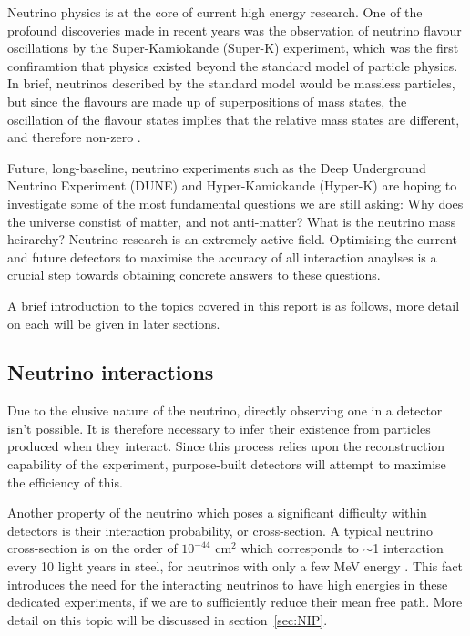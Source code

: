 Neutrino physics is at the core of current high energy research. One of the profound discoveries made in recent years was the observation of neutrino flavour oscillations by the Super-Kamiokande (Super-K) experiment, which was the first confiramtion that physics existed beyond the standard model of particle physics. In brief, neutrinos described by the standard model would be massless particles, but since the flavours are made up of superpositions of mass states, the oscillation of
the flavour states implies that the relative mass states are different, and therefore non-zero \cite{nuInt}.

    Future, long-baseline,  neutrino experiments such as the Deep Underground Neutrino Experiment (DUNE) and Hyper-Kamiokande (Hyper-K) are hoping to investigate some of the most fundamental questions we are still asking: Why does the universe constist of matter, and not anti-matter? What is the neutrino mass heirarchy? Neutrino research is an extremely active field. Optimising the current and future detectors to maximise the accuracy of all interaction anaylses is a crucial step towards obtaining concrete answers to these questions. 

    A brief introduction to the topics covered in this report is as follows, more detail on each will be given in later sections. 

\subsection{Neutrino interactions}

Due to the elusive nature of the neutrino, directly observing one in a detector isn't possible. It is therefore necessary to infer their existence from particles produced when they interact. Since this process relies upon the reconstruction capability of the experiment, purpose-built detectors will attempt to maximise the efficiency of this.

Another property of the neutrino which poses a significant difficulty within detectors is their interaction probability, or cross-section. A typical neutrino cross-section is on the order of $ 10^{-44} $ cm$^{2}$ which corresponds to $\sim$1 interaction every 10 light years in steel, for neutrinos with only a few MeV energy \cite{nuOsc}. This fact introduces the need for the interacting neutrinos to have high energies in these dedicated experiments, if we are to sufficiently reduce their mean free path. More detail on this topic will be discussed in section~\ref{sec:NIP}.

